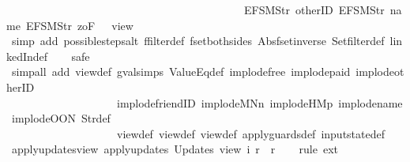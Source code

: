 \begin{isabellebody}
\ \ \ \ \ \ \ \ \ \ \ \ \ \ \ \ \ \ \ \ \ \ \ \ \ \ \ \ \ \ \ \ \ \ \ \ \ \ \ \ \ \ \ {\isacharbrackleft}EFSM{\isachardot}Str\ {\isacharprime}{\isacharprime}otherID{\isacharprime}{\isacharprime}{\isacharcomma}\ EFSM{\isachardot}Str\ {\isacharprime}{\isacharprime}name{\isacharprime}{\isacharprime}{\isacharcomma}\ EFSM{\isachardot}Str\ {\isacharprime}{\isacharprime}{}zoF{\isacharprime}{\isacharprime}{\isacharbrackright}\ {\isacharequal}\ {\isacharbraceleft}{\isacharbar}{\isacharparenleft}{}{\isacharcomma}\ view{}{\isacharparenright}{\isacharbar}{\isacharbraceright}{\isachardoublequoteclose}\isanewline
%
\isadelimproof
\ %
\endisadelimproof
%
\isatagproof
{}\isamarkupfalse%
\ {\isacharparenleft}simp\ add{\isacharcolon}\ possible{\isacharunderscore}steps{\isacharunderscore}alt\ ffilter{\isacharunderscore}def\ fset{\isacharunderscore}both{\isacharunderscore}sides\ Abs{\isacharunderscore}fset{\isacharunderscore}inverse\ Set{\isachardot}filter{\isacharunderscore}def\ linkedIn{\isacharunderscore}def{\isacharparenright}\isanewline
\ \ \isamarkupfalse%
\ safe\isanewline
\ \ \isamarkupfalse%
\ {\isacharparenleft}simp{\isacharunderscore}all\ add{\isacharcolon}\ view{\isacharunderscore}def\ gval{\isachardot}simps\ ValueEq{\isacharunderscore}def\ implode{\isacharunderscore}free\ implode{\isacharunderscore}paid\ implode{\isacharunderscore}otherID\isanewline
\ \ \ \ \ \ \ \ \ \ \ \ \ \ \ \ \ \ \ \ implode{\isacharunderscore}friendID\ implode{\isacharunderscore}MNn{}\ implode{\isacharunderscore}HM{}p\ implode{\isacharunderscore}name\ implode{\isacharunderscore}OON\ Str{\isacharunderscore}def\isanewline
\ \ \ \ \ \ \ \ \ \ \ \ \ \ \ \ \ \ \ \ view{}{\isacharunderscore}def\ view{}{\isacharunderscore}def\ view{}{\isacharunderscore}def\ apply{\isacharunderscore}guards{\isacharunderscore}def\ input{}state{\isacharunderscore}def{\isacharparenright}%
\endisatagproof
{\isafoldproof}%
%
\isadelimproof
\isanewline
%
\endisadelimproof
\isanewline
{}\isamarkupfalse%
\ apply{\isacharunderscore}updates{\isacharunderscore}view{}{\isacharcolon}\ {\isachardoublequoteopen}apply{\isacharunderscore}updates\ {\isacharparenleft}Updates\ view{}{\isacharparenright}\ i\ r\ {\isacharequal}\ r{\isachardoublequoteclose}\isanewline
%
\isadelimproof
\ \ %
\endisadelimproof
%
\isatagproof
{}\isamarkupfalse%
\ {\isacharparenleft}rule\ ext{\isacharparenright}\isanewline
\ \ \isamarkupfalse%

\end{isabellebody}
